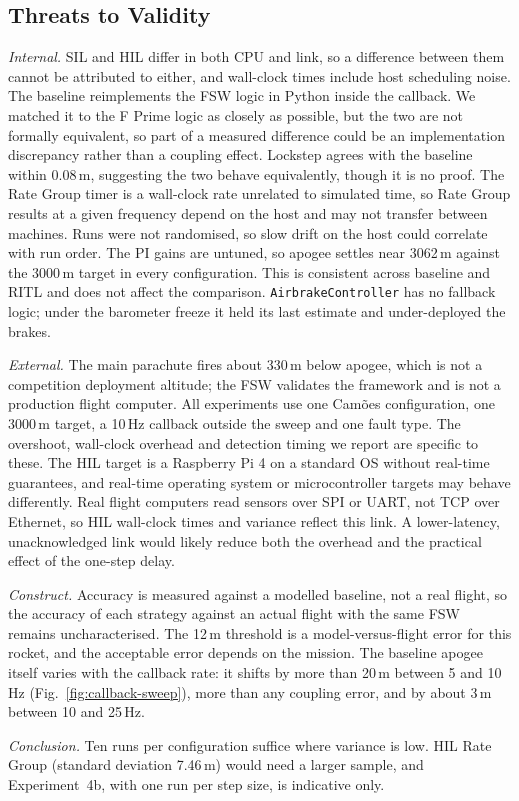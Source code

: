\subsection{Threats to Validity}
\emph{Internal.} SIL and HIL differ in both CPU and link, so a difference between them cannot be attributed to either, and wall-clock times include host scheduling noise. The baseline reimplements the FSW logic in Python inside the callback. We matched it to the F Prime logic as closely as possible, but the two are not formally equivalent, so part of a measured difference could be an implementation discrepancy rather than a coupling effect. Lockstep agrees with the baseline within 0.08\,m, suggesting the two behave equivalently, though it is no proof. The Rate Group timer is a wall-clock rate unrelated to simulated time, so Rate Group results at a given frequency depend on the host and may not transfer between machines. Runs were not randomised, so slow drift on the host could correlate with run order. The PI gains are untuned, so apogee settles near 3062\,m against the 3000\,m target in every configuration. This is consistent across baseline and RITL and does not affect the comparison. \texttt{AirbrakeController} has no fallback logic; under the barometer freeze it held its last estimate and under-deployed the brakes.

\emph{External.} The main parachute fires about 330\,m below apogee, which is not a competition deployment altitude; the FSW validates the framework and is not a production flight computer. All experiments use one Camões configuration, one 3000\,m target, a 10\,Hz callback outside the sweep and one fault type. The overshoot, wall-clock overhead and detection timing we report are specific to these. The HIL target is a Raspberry Pi 4 on a standard OS without real-time guarantees, and real-time operating system or microcontroller targets may behave differently. Real flight computers read sensors over SPI or UART, not TCP over Ethernet, so HIL wall-clock times and variance reflect this link. A lower-latency, unacknowledged link would likely reduce both the overhead and the practical effect of the one-step delay.

\emph{Construct.} Accuracy is measured against a modelled baseline, not a real flight, so the accuracy of each strategy against an actual flight with the same FSW remains uncharacterised. The 12\,m threshold is a model-versus-flight error for this rocket, and the acceptable error depends on the mission. The baseline apogee itself varies with the callback rate: it shifts by more than 20\,m between 5 and 10\,Hz (Fig.~\ref{fig:callback-sweep}), more than any coupling error, and by about 3\,m between 10 and 25\,Hz.

\emph{Conclusion.} Ten runs per configuration suffice where variance is low. HIL Rate Group (standard deviation 7.46\,m) would need a larger sample, and Experiment~4b, with one run per step size, is indicative only.
